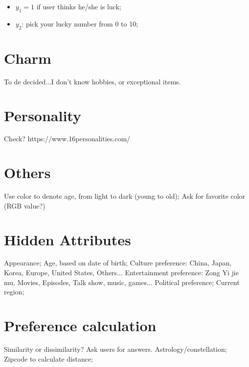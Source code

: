 \documentclass[paper=letter, fontsize=12pt]{scrartcl} %
\numberwithin{equation}{section} %
\numberwithin{figure}{section} %
\numberwithin{table}{section} %
\begin{document}
\begin{itemize}
	\item $y_1=1$ if user thinks he/she is luck;
	\item $y_2$: pick your lucky number from 0 to 10;
\end{itemize}

\section{Charm}
To de decided...I don't know hobbies, or exceptional items.

\section{Personality}
Check? https://www.16personalities.com/

\section{Others}
Use color to denote age, from light to dark (young to old); Ask for favorite color (RGB value?)

\section{Hidden Attributes}
Appearance;
Age, based on date of birth;
Culture preference: China, Japan, Korea, Europe, United States, Others...
Entertainment preference: Zong Yi jie mu, Movies, Episodes, Talk show, music, games...
Political preference;
Current region;

\section{Preference calculation}
Similarity or dissimilarity? Ask users for answers.
Astrology/constellation;
Zipcode to calculate distance;
\end{document}
